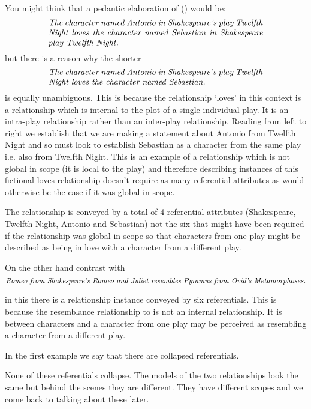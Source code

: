 You might think that a pedantic elaboration of (\label{AntonioLovesSebastian}) would be:
\begin{equation}
\text{\parbox{9cm}{\textit{The character named Antonio in Shakespeare's play Twelfth Night loves the character named Sebastian in Shakespeare play Twelfth Night.}}}
\end{equation} 
but there is a reason why the shorter
\begin{equation}
\text{\parbox{9cm}{\textit{The character named Antonio in Shakespeare's play Twelfth Night loves the character named Sebastian.}}}
\end{equation} 
is equally unambiguous. This is because the relationship `loves' in this context is a relationship which is internal to the plot of a single individual play. 
It is an intra-play relationship rather than an inter-play relationship.
Reading from left to right we establish that we are making a statement about 
Antonio from Twelfth Night  and so must look to establish Sebastian as a character from the same play i.e. also from Twelfth Night. This is an example of a relationship which is not global in scope (it is local to the play) and therefore describing instances of this fictional loves relationship
doesn't require as many referential attributes as would otherwise be the case if it was global in scope. 

The relationship is conveyed by a total of  4 referential attributes
(Shakespeare, Twelfth Night, Antonio and Sebastian) not the six that might have been required
if the relationship was global in scope so that characters from one play might be described as being in love with a character from a different play.

On the other hand contrast with
\begin{equation}
\mbox{\textit{Romeo from Shakespeare's Romeo and Juliet resembles Pyramus from Ovid's 
Metamorphoses.}}
\end{equation}

in this there is a relationship instance conveyed by six referentials. This is because the resemblance relationship to is not an internal relationship. It is between characters and a character from one play may be perceived as resembling a character from a different play.

In the first example we say that there are collapsed referentials. 

None of these referentials collapse. The models of the two relationships
look the same but behind the scenes they are different. They have different scopes and we come back to talking about these later.

